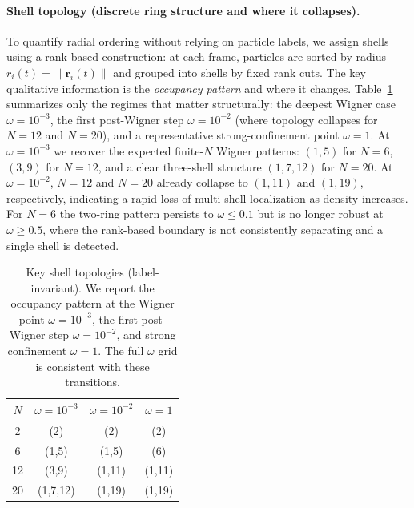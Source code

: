 \documentclass[superscriptaddress,unsortedaddress,amsmath,amssymb,aps]{revtex4-2}
\begin{document}
\paragraph{Shell topology (discrete ring structure and where it collapses).}
To quantify radial ordering without relying on particle labels, we assign shells using a rank-based construction:
at each frame, particles are sorted by radius $r_i(t)=\|\mathbf r_i(t)\|$ and grouped into shells by fixed rank cuts.
The key qualitative information is the \emph{occupancy pattern} and where it changes. Table~\ref{tab:shell_topology_key}
summarizes only the regimes that matter structurally: the deepest Wigner case $\omega=10^{-3}$, the first post-Wigner
step $\omega=10^{-2}$ (where topology collapses for $N=12$ and $N=20$), and a representative strong-confinement point
$\omega=1$. At $\omega=10^{-3}$ we recover the expected finite-$N$ Wigner patterns: $(1,5)$ for $N=6$, $(3,9)$ for
$N=12$, and a clear three-shell structure $(1,7,12)$ for $N=20$. At $\omega=10^{-2}$, $N=12$ and $N=20$ already
collapse to $(1,11)$ and $(1,19)$, respectively, indicating a rapid loss of multi-shell localization as density
increases. For $N=6$ the two-ring pattern persists to $\omega\le 0.1$ but is no longer robust at $\omega\ge 0.5$,
where the rank-based boundary is not consistently separating and a single shell is detected.

\begin{table}[t]
  \centering
  \caption{Key shell topologies (label-invariant). We report the occupancy pattern at the Wigner point
  $\omega=10^{-3}$, the first post-Wigner step $\omega=10^{-2}$, and strong confinement $\omega=1$.
  The full $\omega$ grid is consistent with these transitions.}
  \label{tab:shell_topology_key}

  \begin{threeparttable}
    \setlength{\tabcolsep}{6.2pt}
    \renewcommand{\arraystretch}{1.12}
    \begin{tabular}{c c c c}
      \toprule
      $N$ & $\omega=10^{-3}$ & $\omega=10^{-2}$ & $\omega=1$ \\
      \midrule
      2  & (2)      & (2)      & (2) \\
      6  & (1,5)    & (1,5)    & (6) \\
      12 & (3,9)    & (1,11)   & (1,11) \\
      20 & (1,7,12) & (1,19)   & (1,19) \\
      \bottomrule
    \end{tabular}
  \end{threeparttable}
\end{table}
\end{document}
